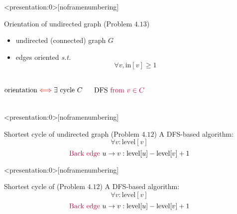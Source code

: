 \begin{frame}<presentation:0>[noframenumbering]
  \begin{exampleblock}{Orientation of undirected graph (Problem $4.13$)}
    \begin{itemize}
      \item undirected (connected) graph $G$ 
      \item edges oriented \emph{s.t.} 
	\[
	  \forall v, \text{in}[v] \ge 1
	\]
    \end{itemize}
  \end{exampleblock}

  \pause
  \begin{columns}
      \[
	\text{orientation} \textcolor{red}{\iff} \exists \text{ cycle } C
      \]

      \pause
      \[
	\text{DFS \textcolor{purple}{from} } \textcolor{purple}{v \in C}
      \]

      \pause
      \vspace{0.50cm}
      \pause
  \end{columns}
\end{frame}

\begin{frame}<presentation:0>[noframenumbering]
  \begin{exampleblock}{Shortest cycle of undirected graph (Problem $4.12$)}
    A  DFS-based algorithm:
    \[
      \forall v: \text{level}[v]
    \]
    \[
      \text{\textcolor{purple}{Back edge }} u \to v: \text{level}[u] - \text{level}[v] + 1
    \]
  \end{exampleblock}

  \pause
\end{frame}

\begin{frame}<presentation:0>[noframenumbering]
  \begin{exampleblock}{Shortest cycle of  (Problem $4.12$)}
    A  DFS-based algorithm:
    \[
      \forall v: \text{level}[v]
    \]
    \[
      \text{\textcolor{purple}{Back edge }} u \to v: \text{level}[u] - \text{level}[v] + 1
    \]
  \end{exampleblock}

  \pause

\end{frame}
